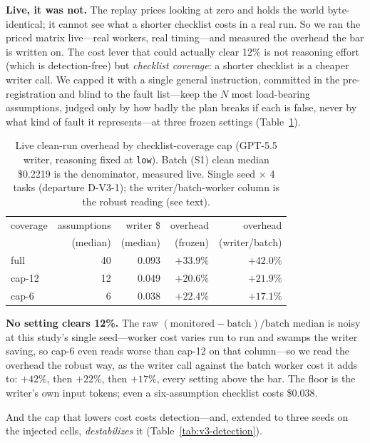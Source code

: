 \documentclass[acmsmall,screen]{acmart}
\begin{document}
\textbf{Live, it was not.} The replay prices looking at zero and holds the world
byte-identical; it cannot see what a shorter checklist costs in a real run. So we
ran the priced matrix live---real workers, real timing---and measured the
overhead the bar is written on. The cost lever that could actually clear 12\% is
not reasoning effort (which is detection-free) but \emph{checklist coverage}: a
shorter checklist is a cheaper writer call. We capped it with a single general
instruction, committed in the pre-registration and blind to the fault list---keep
the $N$ most load-bearing assumptions, judged only by how badly the plan breaks
if each is false, never by what kind of fault it represents---at three frozen
settings (Table~\ref{tab:v3-overhead}).

\begin{table}[t]
\caption{Live clean-run overhead by checklist-coverage cap (GPT-5.5 writer,
reasoning fixed at \texttt{low}). Batch (S1) clean median \$0.2219 is the
denominator, measured live. Single seed $\times$ 4 tasks (departure D-V3-1); the
writer/batch-worker column is the robust reading (see text).}
\label{tab:v3-overhead}
\begin{tabular}{lrrrr}
\toprule
coverage & assumptions & writer \$ & overhead & overhead \\
 & (median) & (median) & (frozen) & (writer/batch) \\
\midrule
full   & 40 & 0.093 & $+33.9\%$ & $+42.0\%$ \\
cap-12 & 12 & 0.049 & $+20.6\%$ & $+21.9\%$ \\
cap-6  &  6 & 0.038 & $+22.4\%$ & $+17.1\%$ \\
\bottomrule
\end{tabular}
\end{table}

\textbf{No setting clears 12\%.} The raw
$(\mathrm{monitored}-\mathrm{batch})/\mathrm{batch}$ median is noisy at this
study's single seed---worker cost varies run to run and swamps the writer
saving, so cap-6 even reads worse than cap-12 on that column---so we read the
overhead the robust way, as the writer call against the batch worker cost it adds
to: $+42\%$, then $+22\%$, then $+17\%$, every setting above the bar. The floor is
the writer's own input tokens; even a six-assumption checklist costs \$0.038.

And the cap that lowers cost costs detection---and, extended to three seeds on
the injected cells, \emph{destabilizes} it (Table~\ref{tab:v3-detection}).
\end{document}
